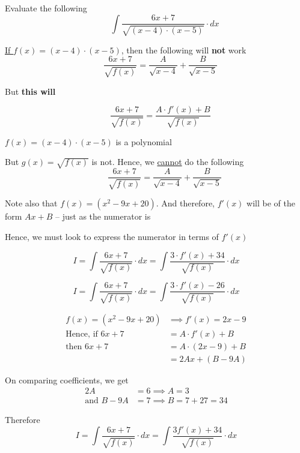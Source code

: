 \documentclass[14pt,fleqn]{extarticle}
\begin{document}
\newcommand\fx{\left(x-4 \right)\cdot \left(x-5 \right)}
\newcommand\fxe{ \left(x^2-9x +20 \right)}
\newcommand\intg{\int \frac{6x+7}{\sqrt{\fx}}\cdot dx}
Evaluate the following \[ \qquad \int \frac{6x+7}{\sqrt{\fx}}\cdot dx \]
%

\newcard

\underline{If $f(x) = \fx$}, then the following will \textbf{not} work 
\[ \quad \frac{6x+7}{\sqrt{f(x)}} = \frac{A}{\sqrt{x-4}} + \frac{B}{\sqrt{x-5}}\]

But \textbf{this will}

\[ \quad \frac{6x+7}{\sqrt{f(x)}} = \frac{A\cdot f'(x) + B}{\sqrt{f(x)}}\]

\newcard 

$f(x) = \fx$ is a polynomial \newline 

But $g(x) = \sqrt{f(x)}$ is not. Hence, we \underline{cannot} do the following 
\[ \qquad \frac{6x+7}{\sqrt{f(x)}} = \frac{A}{\sqrt{x-4}} + \frac{B}{\sqrt{x-5}}\]

Note also that $f(x) = \fxe$. And therefore, $f'(x)$ will be of the form $Ax+B$ -- just as the numerator is \newline 

Hence, we must look to express the numerator in terms of $f'(x)$

\newcard 

\small\[I = \int \frac{6x+7}{\sqrt{f(x)}}\cdot dx = \int \frac{3\cdot f'(x)  + 34}{\sqrt{f(x)}}\cdot dx\]\normalsize

\newcard 
\small\[I = \int \frac{6x+7}{\sqrt{f(x)}}\cdot dx = \int \frac{3\cdot f'(x)  -26}{\sqrt{f(x)}}\cdot dx\]\normalsize 

\newcard 

\begin{align}
f(x) = \fxe &\implies f'(x) = 2x - 9 \\
\text{Hence, if }6x + 7 &= A\cdot f'(x) + B \\
\text{then }6x + 7 &= A\cdot (2x-9) + B \\
&= 2Ax + \left(B-9A \right)
\end{align}

On comparing coefficients, we get 
\begin{align}
2A &= 6 \implies A = 3 \\
\text{and } B-9A &= 7 \implies B = 7 + 27 = 34 
\end{align}

Therefore 
\[ I = \int \frac{6x+7}{\sqrt{f(x)}}\cdot dx = \int \frac{3f'(x) + 34}{\sqrt{f(x)}}\cdot dx\]
\end{document}
